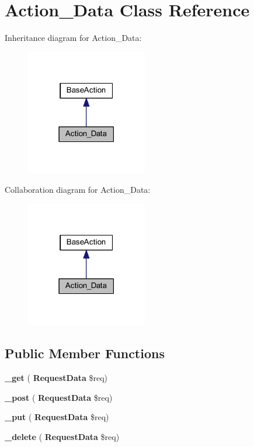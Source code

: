 \section{Action\+\_\+\+Data Class Reference}
\label{class_lora_1_1_api_1_1_action___data}


Inheritance diagram for Action\+\_\+\+Data\+:\nopagebreak
\begin{figure}[H]
\begin{center}
\leavevmode
\includegraphics[width=150pt]{class_lora_1_1_api_1_1_action___data__inherit__graph}
\end{center}
\end{figure}


Collaboration diagram for Action\+\_\+\+Data\+:\nopagebreak
\begin{figure}[H]
\begin{center}
\leavevmode
\includegraphics[width=150pt]{class_lora_1_1_api_1_1_action___data__coll__graph}
\end{center}
\end{figure}
\subsection*{Public Member Functions}
\begin{DoxyCompactItemize}
\item 
\mbox{\label{class_lora_1_1_api_1_1_action___data_a3ad4bf1b146a3180b34d1327ff2abf69}} 
{\bfseries \+\_\+get} (\textbf{ Request\+Data} \$req)
\item 
\mbox{\label{class_lora_1_1_api_1_1_action___data_a50751d47a139282d1c3b08cab1b6562e}} 
{\bfseries \+\_\+post} (\textbf{ Request\+Data} \$req)
\item 
\mbox{\label{class_lora_1_1_api_1_1_action___data_a2affcc8f31c13147c33450193b229194}} 
{\bfseries \+\_\+put} (\textbf{ Request\+Data} \$req)
\item 
\mbox{\label{class_lora_1_1_api_1_1_action___data_ab8ddc6de1e04524212f7d55893f78864}} 
{\bfseries \+\_\+delete} (\textbf{ Request\+Data} \$req)
\end{DoxyCompactItemize}
